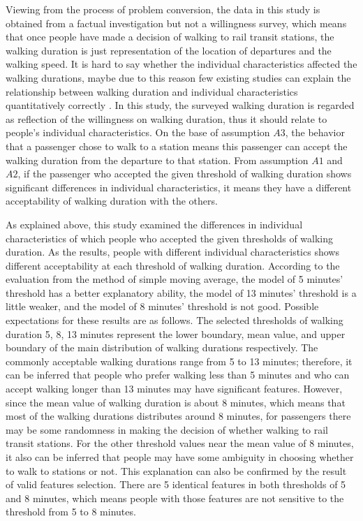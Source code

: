 \documentclass[sustainability,article,submit,moreauthors,pdftex,10pt,a4paper]{Definitions/mdpi}
\begin{document}
% 
Viewing from the process of problem conversion, the data in this study is obtained from a factual investigation but not a willingness survey, which means that once people have made a decision of walking to rail transit stations, the walking duration is just representation of the location of departures and the walking speed. It is hard to say whether the individual characteristics affected the walking durations, maybe due to this reason few existing studies can explain the relationship between walking duration and individual characteristics quantitatively correctly \cite{krygsman2004multimodal,levinson1997density,daniels2013explaining}. In this study, the surveyed walking duration is regarded as reflection of the willingness on walking duration, thus it should relate to people's individual characteristics. On the base of assumption $A3$, the behavior that a passenger chose to walk to a station means this passenger can accept the walking duration from the departure to that station. From assumption $A1$ and $A2$, if the passenger who accepted the given threshold of walking duration shows significant differences in individual characteristics, it means they have a different acceptability of walking duration with the others.

%
As explained above, this study examined the differences in individual characteristics of which people who accepted the given thresholds of walking duration. As the results, people with different individual characteristics shows different acceptability at each threshold of walking duration. According to the evaluation from the method of simple moving average, the model of 5 minutes’ threshold has a better explanatory ability, the model of 13 minutes' threshold is a little weaker, and the model of 8 minutes' threshold is not good. Possible expectations for these results are as follows. The selected thresholds of walking duration 5, 8, 13 minutes represent the lower boundary, mean value, and upper boundary of the main distribution of walking durations respectively. The commonly acceptable walking durations range from 5 to 13 minutes; therefore, it can be inferred that people who prefer walking less than 5 minutes and who can accept walking longer than 13 minutes may have significant features. However, since the mean value of walking duration is about 8 minutes, which means that most of the walking durations distributes around 8 minutes, for passengers there may be some randomness in making the decision of whether walking to rail transit stations. For the other threshold values near the mean value of 8 minutes, it also can be inferred that people may have some ambiguity in choosing whether to walk to stations or not. This explanation can also be confirmed by the result of valid features selection. There are 5 identical features in both thresholds of 5 and 8 minutes, which means people with those features are not sensitive to the threshold from 5 to 8 minutes.
\end{document}

